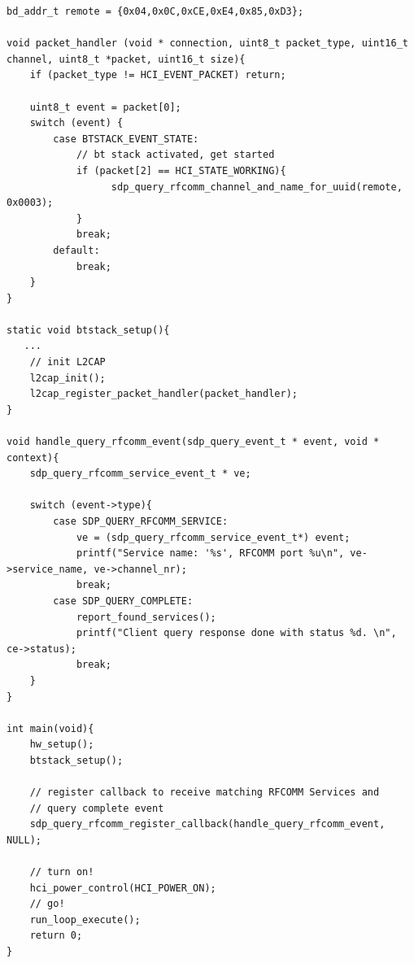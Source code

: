 \documentclass[a4paper,titlepage,oneside,12pt]{amsart} %
\begin{document}
\begin{lstlisting}[caption=Searching RFCOMM services on a remote device., label=SDPClientRFCOMM ]
bd_addr_t remote = {0x04,0x0C,0xCE,0xE4,0x85,0xD3};

void packet_handler (void * connection, uint8_t packet_type, uint16_t channel, uint8_t *packet, uint16_t size){
    if (packet_type != HCI_EVENT_PACKET) return;

    uint8_t event = packet[0];
    switch (event) {
        case BTSTACK_EVENT_STATE:
            // bt stack activated, get started 
            if (packet[2] == HCI_STATE_WORKING){
            	  sdp_query_rfcomm_channel_and_name_for_uuid(remote, 0x0003);
            }
            break;
        default:
            break;
    }
}

static void btstack_setup(){
   ...
    // init L2CAP
    l2cap_init();
    l2cap_register_packet_handler(packet_handler);
}

void handle_query_rfcomm_event(sdp_query_event_t * event, void * context){
    sdp_query_rfcomm_service_event_t * ve;
            
    switch (event->type){
        case SDP_QUERY_RFCOMM_SERVICE:
            ve = (sdp_query_rfcomm_service_event_t*) event;
            printf("Service name: '%s', RFCOMM port %u\n", ve->service_name, ve->channel_nr);
            break;
        case SDP_QUERY_COMPLETE:
            report_found_services();
            printf("Client query response done with status %d. \n", ce->status);
            break;
    }
}

int main(void){
    hw_setup();
    btstack_setup();
    
    // register callback to receive matching RFCOMM Services and 
    // query complete event 
    sdp_query_rfcomm_register_callback(handle_query_rfcomm_event, NULL);

    // turn on!
    hci_power_control(HCI_POWER_ON);
    // go!
    run_loop_execute(); 
    return 0;
}

\end{lstlisting}
\end{document}
